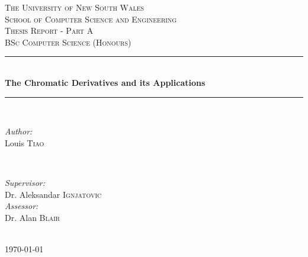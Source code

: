 \documentclass[12pt]{article} %
\begin{document}

\begin{titlepage}

\newcommand{\HRule}{\rule{\linewidth}{0.5mm}} %

\center %

\textsc{\Large The University of New South Wales}\\[0.2cm]
\textsc{\large School of Computer Science and Engineering}\\[1.5cm] %

\textsc{\large Thesis Report - Part A}\\[0.5cm] %
\textsc{BSc Computer Science (Honours)}\\[0.5cm] %

\HRule \\[0.4cm]
{ \LARGE \bfseries The Chromatic Derivatives and its Applications }\\[0.4cm] %
\HRule \\[1.5cm]

\begin{minipage}[t]{0.4\textwidth}
\begin{flushleft} \large
\emph{Author:}\\
Louis \textsc{Tiao} %
\end{flushleft}
\end{minipage}
~
\begin{minipage}[t]{0.5\textwidth}
\begin{flushright} \large
\emph{Supervisor:} \\
Dr. Aleksandar \textsc{Ignjatovic} %
\\[0.5cm]
\emph{Assessor:} \\
Dr. Alan \textsc{Blair} %
\end{flushright}
\end{minipage}\\[4cm]

{\large \today}\\[3cm] %


\vfill %

\end{titlepage}
\end{document}
